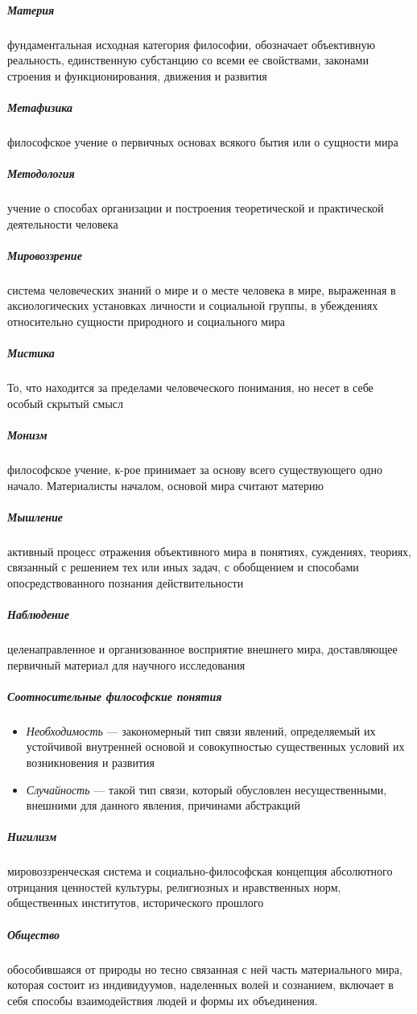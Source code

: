 \documentclass[a4paper, 12pt]{article}
\theoremstyle{plain} %
\theoremstyle{definition} %
\theoremstyle{remark} %
\begin{document}
\subparagraph{Материя}
	 фундаментальная исходная категория философии, обозначает объективную реальность, единственную субстанцию со всеми ее свойствами, законами строения и функционирования, движения и развития

\subparagraph{Метафизика}
	 философское учение о первичных основах всякого бытия или о сущности мира

\subparagraph{Методология}
	учение о способах организации и построения теоретической и практической деятельности человека

\subparagraph{Мировоззрение}
	система человеческих знаний о мире и о месте человека в мире, выраженная в аксиологических установках личности и социальной группы, в убеждениях относительно сущности природного и социального мира

\subparagraph{Мистика}
	То, что находится за пределами человеческого понимания, но несет в себе особый скрытый смысл

\subparagraph{Монизм}
	философское учение, к-рое принимает за основу всего существующего одно начало. Материалисты началом, основой мира считают материю

\subparagraph{Мышление}
	активный процесс отражения объективного мира в понятиях, суждениях, теориях, связанный с решением тех или иных задач, с обобщением и способами опосредствованного познания действительности

\subparagraph{Наблюдение}
	 целенаправленное и организованное восприятие внешнего мира, доставляющее первичный материал для научного исследования

\subparagraph{Соотносительные философские понятия}
\begin{itemize}
	\item[] \emph{Необходимость} --- закономерный тип связи явлений, определяемый их устойчивой внутренней основой и совокупностью существенных условий их возникновения и развития
	\item[] \emph{Случайность} --- такой тип связи, который обусловлен несущественными, внешними для данного явления, причинами абстракций
\end{itemize}

\subparagraph{Нигилизм}
	мировоззренческая система и социально-философская концепция абсолютного отрицания ценностей культуры, религиозных и нравственных норм, общественных институтов, исторического прошлого

\subparagraph{Общество}
	обособившаяся от природы но тесно связанная с ней часть материального мира, которая состоит из индивидуумов, наделенных волей и сознанием, включает в себя способы взаимодействия людей и формы их объединения.
\end{document}
